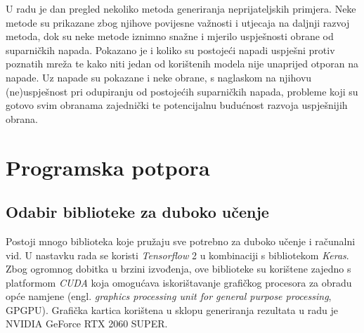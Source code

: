\documentclass[utf8, diplomski]{fer}
\begin{document}
U radu je dan pregled nekoliko metoda generiranja neprijateljskih primjera. Neke metode su prikazane zbog njihove povijesne važnosti i utjecaja na daljnji razvoj metoda, dok su neke metode iznimno snažne i mjerilo uspješnosti obrane od suparničkih napada. Pokazano je i koliko su postojeći napadi uspješni protiv poznatih mreža te kako niti jedan od korištenih modela nije unaprijed otporan na napade. Uz napade su pokazane i neke obrane, s naglaskom na njihovu (ne)uspješnost pri odupiranju od postojećih suparničkih napada, probleme koji su gotovo svim obranama zajednički te potencijalnu budućnost razvoja uspješnijih obrana.


\chapter{Programska potpora}
\section{Odabir biblioteke za duboko učenje}
Postoji mnogo biblioteka koje pružaju sve potrebno za duboko učenje i računalni vid. U nastavku rada se koristi \textit{Tensorflow} 2\citep{abadi2016tensorflow} u kombinaciji s bibliotekom \textit{Keras}\citep{chollet2015keras}. Zbog ogromnog dobitka u brzini izvođenja, ove biblioteke su korištene zajedno s platformom \textit{CUDA} koja omogućava iskorištavanje grafičkog procesora za obradu opće namjene (engl. \textit{graphics processing unit for general purpose processing}, GPGPU). Grafička kartica korištena u sklopu generiranja rezultata u radu je NVIDIA GeForce RTX 2060 SUPER.
\end{document}
